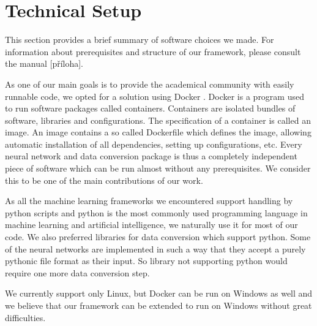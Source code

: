 \section{Technical Setup}
This section provides a brief summary of software choices we made. For information about prerequisites and structure of our framework, please consult the manual [příloha]. \par
As one of our main goals is to provide the academical community with easily runnable code, we opted for a solution using Docker \cite{merkel_docker:_2014}. Docker is a program used to run software packages called containers. Containers are isolated bundles of software, libraries and configurations. The specification of a container is called an image. An image contains a so called Dockerfile which defines the image, allowing automatic installation of all dependencies, setting up configurations, etc. Every neural network and data conversion package is thus a completely independent piece of software which can be run almost without any prerequisites. We consider this to be one of the main contributions of our work. \par
As all the machine learning frameworks we encountered support handling by python scripts and python is the most commonly used programming language in machine learning and artificial intelligence, we naturally use it for most of our code. We also preferred libraries for data conversion which support python. Some of the neural networks are implemented in such a way that they accept a purely pythonic file format as their input. So library not supporting python would require one more data conversion step.\par
We currently support only Linux, but Docker can be run on Windows as well and we believe that our framework can be extended to run on Windows without great difficulties. 
